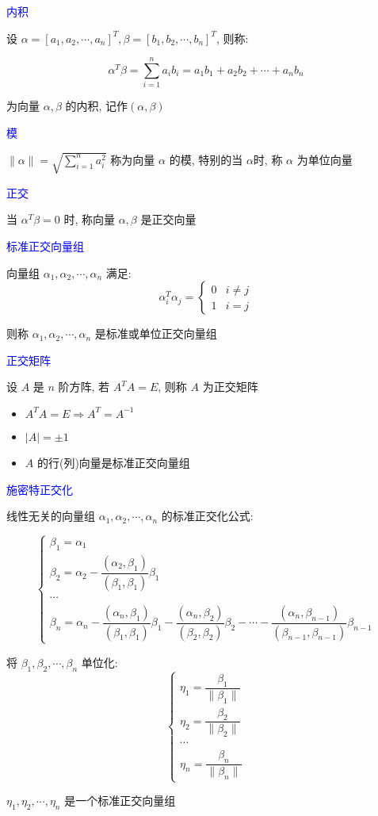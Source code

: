 \begin{definition}[向量的内积和正交]
	\textcolor{blue}{内积}
	
	设 $\alpha=[a_{1},a_{2},\cdots,a_{n}]^{T}, \beta=[b_{1},b_{2},\cdots,b_{n}]^{T}$, 则称: 

	$$\alpha^{T}\beta=\sum\limits_{i=1}^{n}a_{i}b_{i}=a_{1}b_{1}+a_{2}b_{2}+\cdots+a_{n}b_{n}$$
	
	为向量 $\alpha,\beta$ 的内积, 记作$(\alpha, \beta)$
	
	\textcolor{blue}{模}

	$\|\alpha\| = \sqrt{\sum\limits_{i=1}^{n}a_{i}^2}$ 称为向量 $\alpha$ 的模, 特别的当 $\alpha$时, 称 $\alpha$ 为单位向量
	
	\textcolor{blue}{正交}
	
	当 $\alpha^{T}\beta=0$ 时, 称向量 $\alpha,\beta$ 是正交向量
	
	\textcolor{blue}{标准正交向量组}
	
	向量组 $\alpha_{1},\alpha_{2},\cdots,\alpha_{n}$ 满足:  
	$$\alpha_{i}^{T}\alpha_{j} =  
	\begin{cases}
		0 & i\neq j\\
		1 & i= j
	\end{cases}$$
	
	则称 $\alpha_{1},\alpha_{2},\cdots,\alpha_{n}$ 是标准或单位正交向量组

	\textcolor{blue}{正交矩阵}

	设 $A$ 是 $n$ 阶方阵, 若 $A^{T}A=E$, 则称 $A$ 为正交矩阵
	\begin{itemize}
		\item $A^{T}A=E\Rightarrow A^{T}=A^{-1}$
		\item $|A| = \pm 1$
		\item $A$ 的行(列)向量是标准正交向量组
	\end{itemize}
	
	\textcolor{blue}{施密特正交化}
	
	线性无关的向量组 $\alpha_{1},\alpha_{2},\cdots,\alpha_{n}$ 的标准正交化公式:
	
	$$\begin{cases}
		\beta_{1} = \alpha_{1}\\
		\beta_{2} = \alpha_{2}-\dfrac{(\alpha_{2},\beta_{1})}{(\beta_{1},\beta_{1})}\beta_{1}\\
		\cdots\\
		\beta_{n} = \alpha_{n}-\dfrac{(\alpha_{n},\beta_{1})}{(\beta_{1},\beta_{1})}\beta_{1}-\dfrac{(\alpha_{n},\beta_{2})}{(\beta_{2},\beta_{2})}\beta_{2}-\cdots-\dfrac{(\alpha_{n},\beta_{n-1})}{(\beta_{n-1},\beta_{n-1})}\beta_{n-1}
	\end{cases}$$

	将 $\beta_{1},\beta_{2},\cdots,\beta_{n}$ 单位化:
	$$\begin{cases}
		\eta_{1} = \dfrac{\beta_{1}}{\|\beta_{1}\|}\\
		\eta_{2} = \dfrac{\beta_{2}}{\|\beta_{2}\|}\\
		\cdots\\
		\eta_{n} = \dfrac{\beta_{n}}{\|\beta_{n}\|}
	\end{cases}$$  
	
	$\eta_{1},\eta_{2},\cdots,\eta_{n}$ 是一个标准正交向量组
\end{definition}

